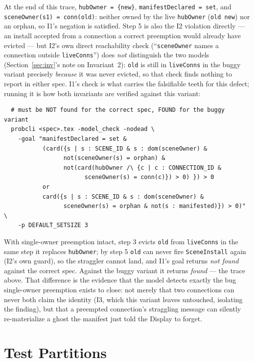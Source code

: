 \documentclass[a4paper,10pt,fleqn]{article}
\begin{document}
At the end of this trace, \texttt{hubOwner = \{new\}},
\texttt{manifestDeclared = set}, and \texttt{sceneOwner(s1) = conn(old)}:
neither owned by the live \texttt{hubOwner} (\texttt{old \neq new}) nor an
orphan, so I1's negation is satisfied.  Step 5 is also the I2 violation
directly --- an install accepted from a connection a correct preemption
would already have evicted --- but I2's own direct reachability check
(``\texttt{sceneOwner} names a connection outside \texttt{liveConns}'')
does \emph{not} distinguish the two models (Section~\ref{sec:inv}'s note
on Invariant~2): \texttt{old} is still in \texttt{liveConns} in the buggy
variant precisely \emph{because} it was never evicted, so that check
finds nothing to report in either spec.  I1's check is what carries the
falsifiable teeth for this defect; running it is how both invariants are
verified against this variant:
\begin{verbatim}
  # must be NOT found for the correct spec, FOUND for the buggy variant
  probcli <spec>.tex -model_check -nodead \
    -goal "manifestDeclared = set &
           (card({s | s : SCENE_ID & s : dom(sceneOwner) &
                 not(sceneOwner(s) = orphan) &
                 not(card(hubOwner /\ {c | c : CONNECTION_ID &
                       sceneOwner(s) = conn(c)}) > 0) }) > 0
           or
           card({s | s : SCENE_ID & s : dom(sceneOwner) &
                 sceneOwner(s) = orphan & not(s : manifested)}) > 0)" \
    -p DEFAULT_SETSIZE 3
\end{verbatim}
With single-owner preemption intact, step 3 evicts \texttt{old} from
\texttt{liveConns} in the same step it replaces \texttt{hubOwner}; by step
5 \texttt{old} can never fire \texttt{SceneInstall} again (I2's own
guard), so the straggler cannot land, and I1's goal returns \emph{not
found} against the correct spec.  Against the buggy variant it returns
\emph{found} --- the trace above.  That difference is the evidence that
the model detects exactly the bug single-owner preemption exists to
close: not merely that two connections can never both claim the identity
(I3, which this variant leaves untouched, isolating the finding), but
that a preempted connection's straggling message can silently
re-materialize a ghost the manifest just told the Display to forget.

\section{Test Partitions}
\label{sec:partitions}
\end{document}
